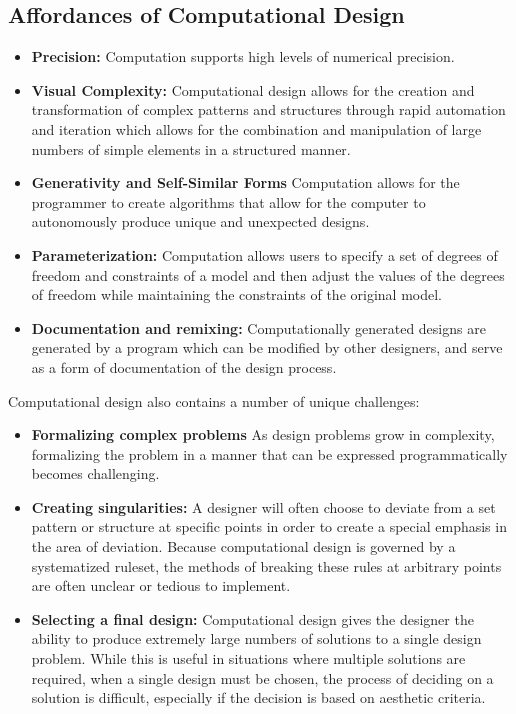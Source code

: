 \documentclass{sigchi}
\begin{document}
\subsection{Affordances of Computational Design}
\begin{itemize}
\item \textbf{Precision:} Computation supports high levels of numerical precision.
\item \textbf{Visual Complexity:} Computational design allows for the creation and transformation of complex patterns and structures through rapid automation and iteration which allows for the combination and manipulation of large numbers of simple elements in a structured manner. 
\item \textbf{Generativity and Self-Similar Forms} Computation allows for the programmer to create algorithms that allow for the computer to autonomously produce unique and unexpected designs.
\item \textbf{Parameterization:} Computation allows users to specify a set of degrees of freedom and constraints of a model and then adjust the values of the degrees of freedom while maintaining the constraints of the original model.
\item \textbf{Documentation and remixing:} Computationally generated designs are generated by a program which can be modified by other designers, and serve as a form of documentation of the design process. 
\end{itemize}	
Computational design also contains a number of unique challenges:
\begin{itemize}
\item \textbf{Formalizing complex problems} As design problems grow in complexity, formalizing the problem in a manner that can be expressed programmatically becomes challenging. 
\item \textbf{Creating singularities:} A designer will often choose to deviate from a set pattern or structure at specific points in order to create a special emphasis in the area of deviation. Because computational design is governed by a systematized ruleset, the methods of breaking these rules at arbitrary points are often unclear or tedious to implement. 
\item \textbf{Selecting a final design:} Computational design gives the designer the ability to produce extremely large numbers of solutions to a single design problem. While this is useful in situations where multiple solutions are required, when a single design must be chosen, the process of deciding on a solution is difficult, especially if the decision is based on aesthetic criteria.
\end{itemize}
\end{document}
